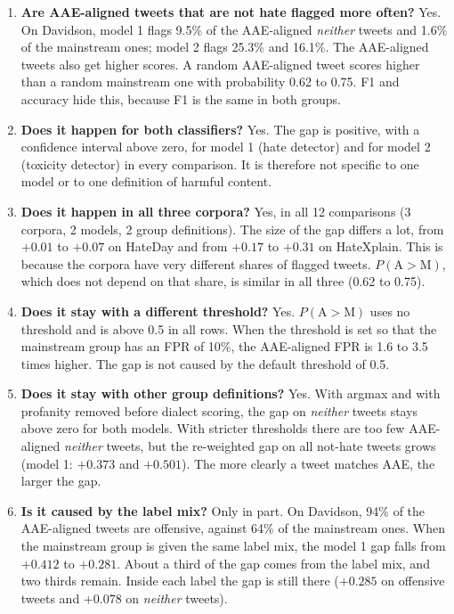 \documentclass[runningheads,a4paper,oribibl]{llncs}
\begin{document}
\begin{enumerate}
\item \textbf{Are AAE-aligned tweets that are not hate flagged more often?} Yes. On Davidson,
model 1 flags 9.5\% of the AAE-aligned \emph{neither} tweets and 1.6\% of the mainstream ones;
model 2 flags 25.3\% and 16.1\%. The AAE-aligned tweets also get higher scores. A random
AAE-aligned tweet scores higher than a random mainstream one with probability 0.62 to 0.75.
F1 and accuracy hide this, because F1 is the same in both groups.

\item \textbf{Does it happen for both classifiers?} Yes. The gap is positive, with a confidence
interval above zero, for model 1 (hate detector) and for model 2 (toxicity detector) in every
comparison. It is therefore not specific to one model or to one definition of harmful content.

\item \textbf{Does it happen in all three corpora?} Yes, in all 12 comparisons (3 corpora,
2 models, 2 group definitions). The size of the gap differs a lot, from $+0.01$ to $+0.07$ on
HateDay and from $+0.17$ to $+0.31$ on HateXplain. This is because the corpora have very
different shares of flagged tweets. $P(\mathrm{A}{>}\mathrm{M})$, which does not depend on
that share, is similar in all three (0.62 to 0.75).

\item \textbf{Does it stay with a different threshold?} Yes. $P(\mathrm{A}{>}\mathrm{M})$ uses
no threshold and is above 0.5 in all rows. When the threshold is set so that the mainstream
group has an FPR of 10\%, the AAE-aligned FPR is 1.6 to 3.5 times higher. The gap is not
caused by the default threshold of 0.5.

\item \textbf{Does it stay with other group definitions?} Yes. With argmax and with profanity
removed before dialect scoring, the gap on \emph{neither} tweets stays above zero for both
models. With stricter thresholds there are too few AAE-aligned \emph{neither} tweets, but the
re-weighted gap on all not-hate tweets grows (model 1: $+0.373$ and $+0.501$). The more clearly
a tweet matches AAE, the larger the gap.

\item \textbf{Is it caused by the label mix?} Only in part. On Davidson, 94\% of the AAE-aligned
tweets are offensive, against 64\% of the mainstream ones. When the mainstream group is given
the same label mix, the model 1 gap falls from $+0.412$ to $+0.281$. About a third of the gap
comes from the label mix, and two thirds remain. Inside each label the gap is still there
($+0.285$ on offensive tweets and $+0.078$ on \emph{neither} tweets).


\end{enumerate}
\end{document}
